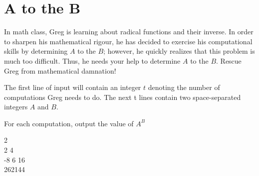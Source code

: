 \section{$\boldsymbol{A}$ to the $\boldsymbol{B}$}
In math class, Greg is learning about radical functions and their inverse. In order to sharpen his mathematical rigour, he has decided to exercise his computational skills by determining $A$ to the $B$; however, he quickly realizes that this problem is much too difficult. Thus, he needs your help to determine $A$ to the $B$. Rescue Greg from mathematical damnation!

The first line of input will contain an integer $t$ denoting the number of computations Greg needs to do. The next t lines contain two space-separated integers $A$ and $B$.

\outputformat
For each computation, output the value of $A^{B}$

\addsample
{
    2 \\
    2 4 \\
    -8 6
}
{
    16 \\
    262144
}